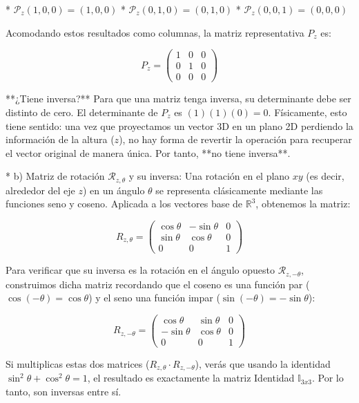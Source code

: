\documentclass[11pt,spanish]{article}
\begin{document}
* $\mathcal{P}_{z}(1, 0, 0) = (1, 0, 0)$
* $\mathcal{P}_{z}(0, 1, 0) = (0, 1, 0)$
* $\mathcal{P}_{z}(0, 0, 1) = (0, 0, 0)$


Acomodando estos resultados como columnas, la matriz representativa $P_{z}$ es:

$$P_{z} = \begin{pmatrix} 1 & 0 & 0 \\ 0 & 1 & 0 \\ 0 & 0 & 0 \end{pmatrix}$$



**¿Tiene inversa?** Para que una matriz tenga inversa, su determinante debe ser distinto de cero. El determinante de $P_{z}$ es $(1)(1)(0) = 0$. Físicamente, esto tiene sentido: una vez que proyectamos un vector 3D en un plano 2D perdiendo la información de la altura ($z$), no hay forma de revertir la operación para recuperar el vector original de manera única. Por tanto, **no tiene inversa**.


* 
b) Matriz de rotación $\mathcal{R}_{z,\theta}$ y su inversa:
Una rotación en el plano $xy$ (es decir, alrededor del eje $z$) en un ángulo $\theta$ se representa clásicamente mediante las funciones seno y coseno. Aplicada a los vectores base de $\mathbb{R}^{3}$, obtenemos la matriz:



$$R_{z,\theta} = \begin{pmatrix} \cos\theta & -\sin\theta & 0 \\ \sin\theta & \cos\theta & 0 \\ 0 & 0 & 1 \end{pmatrix}$$


Para verificar que su inversa es la rotación en el ángulo opuesto $\mathcal{R}_{z,-\theta}$, construimos dicha matriz recordando que el coseno es una función par ($\cos(-\theta)=\cos\theta$) y el seno una función impar ($\sin(-\theta)=-\sin\theta$):



$$R_{z,-\theta} = \begin{pmatrix} \cos\theta & \sin\theta & 0 \\ -\sin\theta & \cos\theta & 0 \\ 0 & 0 & 1 \end{pmatrix}$$



Si multiplicas estas dos matrices ($R_{z,\theta} \cdot R_{z,-\theta}$), verás que usando la identidad $\sin^{2}\theta + \cos^{2}\theta = 1$, el resultado es exactamente la matriz Identidad $\mathbb{I}_{3x3}$. Por lo tanto, son inversas entre sí.
\end{document}
